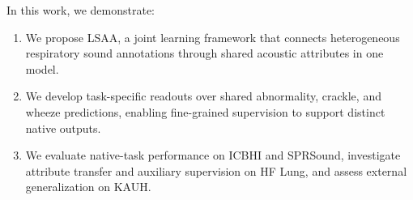 In this work, we demonstrate:
\begin{enumerate}
\setlength{\itemsep}{1pt}
\setlength{\parsep}{0pt}
\item We propose LSAA, a joint learning framework that connects heterogeneous
respiratory sound annotations through shared acoustic attributes in one model.
\item We develop task-specific readouts over shared abnormality, crackle,
and wheeze predictions, enabling fine-grained supervision to support
distinct native outputs.
\item We evaluate native-task performance on ICBHI and SPRSound,
investigate attribute transfer and auxiliary supervision on HF
Lung\cite{hsu2021hflung}, and assess external generalization on
KAUH\cite{fraiwan2021kauh}.
\end{enumerate}
